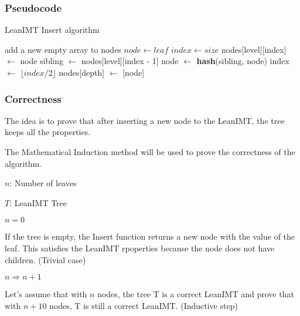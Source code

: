 \documentclass{article}
\begin{document}
\bigbreak

\subsubsection{Pseudocode}

\begin{algorithm}[H]
    \caption{LeanIMT Insert algorithm}\label{insert}
    \begin{algorithmic}[1]
         
        \State add a new empty array to nodes 
        \EndIf
        \State $node\gets leaf$
        \State $index\gets size$ 
        \State nodes[level][index] $\gets$ node
         
        \State sibling $\gets$ nodes[level][index - 1]
        \State node $\gets$ \textbf{hash}(sibling, node)
        \EndIf
        \State index $\gets$ $\lfloor index/2 \rfloor$ 
        \EndFor
        \State nodes[depth] $\gets$ [node] 
        \EndProcedure
    \end{algorithmic}
\end{algorithm}

\bigbreak

\subsubsection{Correctness}

The idea is to prove that after inserting a new node to the LeanIMT, the tree keeps all the properties.

The Mathematical Induction method will be used to prove the correctness of the algorithm.

$n$: Number of leaves

$T$: LeanIMT Tree

$n=0$

If the tree is empty, the Insert function returns a new node with the value of the leaf. This satisfies the LeanIMT rpoperties because the node does not have children. (Trivial case)

$n \Rightarrow n+1$

Let's assume that with $n$ nodes, the tree T is a correct LeanIMT and prove that with $n+10$ nodes, T is still a correct LeanIMT. (Inductive step)
\end{document}
